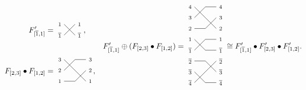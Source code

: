 \documentclass[11pt]{article}
\theoremstyle{definition}
\numberwithin{equation}{section}
\begin{document}
\begin{equation*}
  \begin{aligned}
      &\phantom . \\
  F'_{[\ol1,1]} &=
\begin{tikzpicture}[scale=.5,baseline=-25]
\node at (-.4,-1) {$\scriptstyle 1$};
\node at (-.4,-2) {$\scriptstyle{\ol1}$};
\node at (1.4,-1) {$\scriptstyle 1$};
\node at (1.4,-2) {$\scriptstyle{\ol1}$};
\draw[-] (0,-1) -- (1,-2);
\draw[-] (0,-2) -- (1,-1);
\end{tikzpicture},\\
\\
  F_{[2,3]} \bullet F_{[1,2]} &=
\begin{tikzpicture}[scale=.5,baseline=-18]
\node at (-.4,0)  {$\scriptstyle 3$};
\node at (-.4,-1) {$\scriptstyle 2$};
\node at (-.4,-2) {$\scriptstyle 1$};
\node at (2.4,0)  {$\scriptstyle 3$};
\node at (2.4,-1) {$\scriptstyle 2$};
\node at (2.4,-2) {$\scriptstyle 1$};
\draw[-] (0,0) -- (2,-2);
\draw[-] (0,-1) -- (1,0) -- (2,0);
\draw[-] (0,-2) -- (1,-2) -- (2,-1);
\end{tikzpicture}\ntnsp,
\end{aligned}
  \quad
  F'_{[\ol1,1]} \oplus ( F_{[2,3]} \bullet F_{[1,2]} ) = 
\begin{tikzpicture}[scale=.5,baseline=-5]
  \node at (-.4,3.5) {$\scriptstyle 4$};
  \node at (-.4,2.5) {$\scriptstyle 3$};
  \node at (-.4,1.5) {$\scriptstyle 2$};
  \node at (-.4,0.5) {$\scriptstyle 1$};
  \node at (-.4,-0.5) {$\scriptstyle \ol1$};
  \node at (-.4,-1.5) {$\scriptstyle \ol2$};
  \node at (-.4,-2.5) {$\scriptstyle \ol3$};
  \node at (-.4,-3.5) {$\scriptstyle \ol4$};
  \node at (2.4,3.5) {$\scriptstyle 4$};
  \node at (2.4,2.5) {$\scriptstyle 3$};
  \node at (2.4,1.5) {$\scriptstyle 2$};
  \node at (2.4,0.5) {$\scriptstyle 1$};
  \node at (2.4,-0.5) {$\scriptstyle \ol1$};
  \node at (2.4,-1.5) {$\scriptstyle \ol2$};
  \node at (2.4,-2.5) {$\scriptstyle \ol3$};
  \node at (2.4,-3.5) {$\scriptstyle \ol4$};
\draw[-] (0,3.5) -- (2,1.5);
\draw[-] (0,2.5) -- (1,3.5) -- (2,3.5);
\draw[-] (0,1.5) -- (1,1.5) -- (2,2.5);
\draw[-] (0,0.5) -- (1,-0.5) -- (2,-0.5);
\draw[-] (0,-3.5) -- (2,-1.5);
\draw[-] (0,-2.5) -- (1,-3.5) -- (2,-3.5);
\draw[-] (0,-1.5) -- (1,-1.5) -- (2,-2.5);
\draw[-] (0,-0.5) -- (1,0.5) -- (2,0.5);
\end{tikzpicture}
\cong F'_{[\ol1,1]} \bullet F'_{[2,3]} \bullet F'_{[1,2]}.
\end{equation*}
\end{document}
